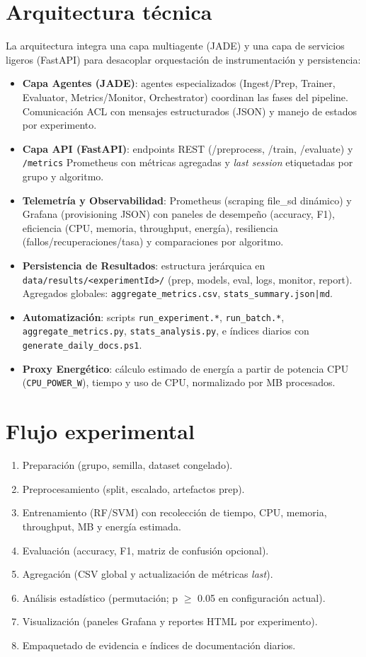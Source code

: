 \documentclass[12pt,oneside]{report}
\begin{document}
\section{Arquitectura técnica}
La arquitectura integra una capa multiagente (JADE) y una capa de servicios ligeros (FastAPI) para desacoplar orquestación de instrumentación y persistencia:
\begin{itemize}
    \item \textbf{Capa Agentes (JADE)}: agentes especializados (Ingest/Prep, Trainer, Evaluator, Metrics/Monitor, Orchestrator) coordinan las fases del pipeline. Comunicación ACL con mensajes estructurados (JSON) y manejo de estados por experimento.
    \item \textbf{Capa API (FastAPI)}: endpoints REST (/preprocess, /train, /evaluate) y \texttt{/metrics} Prometheus con métricas agregadas y \emph{last session} etiquetadas por grupo y algoritmo.
    \item \textbf{Telemetría y Observabilidad}: Prometheus (scraping file\_sd dinámico) y Grafana (provisioning JSON) con paneles de desempeño (accuracy, F1), eficiencia (CPU, memoria, throughput, energía), resiliencia (fallos/recuperaciones/tasa) y comparaciones por algoritmo.
    \item \textbf{Persistencia de Resultados}: estructura jerárquica en \texttt{data/results/<experimentId>/} (prep, models, eval, logs, monitor, report). Agregados globales: \texttt{aggregate\_metrics.csv}, \texttt{stats\_summary.json|md}.
    \item \textbf{Automatización}: scripts \texttt{run\_experiment.*}, \texttt{run\_batch.*}, \texttt{aggregate\_metrics.py}, \texttt{stats\_analysis.py}, e índices diarios con \texttt{generate\_daily\_docs.ps1}.
    \item \textbf{Proxy Energético}: cálculo estimado de energía a partir de potencia CPU (\texttt{CPU\_POWER\_W}), tiempo y uso de CPU, normalizado por MB procesados.
\end{itemize}

\section{Flujo experimental}
\begin{enumerate}
    \item Preparación (grupo, semilla, dataset congelado).
    \item Preprocesamiento (split, escalado, artefactos prep).\label{flujo:prep}
    \item Entrenamiento (RF/SVM) con recolección de tiempo, CPU, memoria, throughput, MB y energía estimada.
    \item Evaluación (accuracy, F1, matriz de confusión opcional).
    \item Agregación (CSV global y actualización de métricas \emph{last}).
    \item Análisis estadístico (permutación; p \(\ge\) 0.05 en configuración actual).
    \item Visualización (paneles Grafana y reportes HTML por experimento).
    \item Empaquetado de evidencia e índices de documentación diarios.
\end{enumerate}
\end{document}

